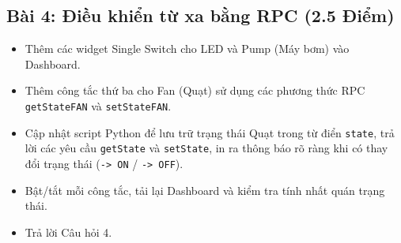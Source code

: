 \newpage
\subsection{Bài 4: Điều khiển từ xa bằng RPC (2.5 Điểm)}

\begin{tcolorbox}[
    enhanced, colback=black!2, colframe=black!60, boxrule=1pt, arc=2.5mm, drop shadow,
    attach boxed title to top left={xshift=4mm, yshift=-3mm},
    boxed title style={enhanced, colback=black!85, colframe=black!85, boxrule=1pt, arc=2.5mm, drop shadow, left=6pt, right=6pt, top=2pt, bottom=2pt},
    title=\textcolor{white}{\large\textbf{Yêu cầu đề bài (Trích phiếu bài tập)}}
]
\bfseries
\vspace{0.2cm}
\begin{itemize}
    \item Thêm các widget Single Switch cho LED và Pump (Máy bơm) vào Dashboard.
    \item Thêm công tắc thứ ba cho Fan (Quạt) sử dụng các phương thức RPC \texttt{getStateFAN} và \texttt{setStateFAN}.
    \item Cập nhật script Python để lưu trữ trạng thái Quạt trong từ điển \texttt{state}, trả lời các yêu cầu \texttt{getState} và \texttt{setState}, in ra thông báo rõ ràng khi có thay đổi trạng thái (\texttt{-> ON} / \texttt{-> OFF}).
    \item Bật/tắt mỗi công tắc, tải lại Dashboard và kiểm tra tính nhất quán trạng thái.
    \item Trả lời Câu hỏi 4.
\end{itemize}
\end{tcolorbox}

\vspace{0.3cm}
